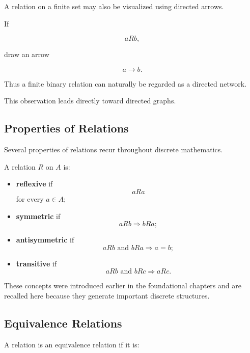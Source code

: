 A relation on a finite set may also be visualized using directed
arrows.

If

\[
aRb,
\]

draw an arrow

\[
a\longrightarrow b.
\]

Thus a finite binary relation can naturally be regarded as a directed
network.

This observation leads directly toward directed graphs.

\subsection{Properties of Relations}
\label{subsec:properties-relations-review}

Several properties of relations recur throughout discrete mathematics.

A relation \(R\) on \(A\) is:

\begin{itemize}
    \item \textbf{reflexive} if
    \[
    aRa
    \]
    for every \(a\in A\);

    \item \textbf{symmetric} if
    \[
    aRb\Longrightarrow bRa;
    \]

    \item \textbf{antisymmetric} if
    \[
    aRb\text{ and }bRa
    \Longrightarrow
    a=b;
    \]

    \item \textbf{transitive} if
    \[
    aRb\text{ and }bRc
    \Longrightarrow
    aRc.
    \]
\end{itemize}

These concepts were introduced earlier in the foundational chapters and
are recalled here because they generate important discrete structures.

\subsection{Equivalence Relations}
\label{subsec:equivalence-relations-discrete}

A relation is an equivalence relation if it is:

